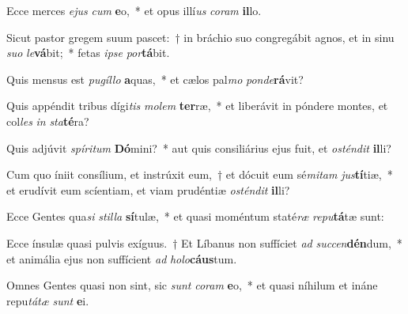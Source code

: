 \item Ecce merces \textit{e}\textit{jus} \textit{cum} \textbf{e}o,~* et opus illí\textit{us} \textit{co}\textit{ram} \textbf{il}lo.
\item Sicut pastor gregem suum pascet:~† in bráchio suo congregábit agnos, et in sinu \textit{su}\textit{o} \textit{le}\textbf{vá}bit;~* fetas \textit{ip}\textit{se} \textit{por}\textbf{tá}bit.
\item Quis mensus est \textit{pu}\textit{gíl}\textit{lo} \textbf{a}quas,~* et cælos pal\textit{mo} \textit{pon}\textit{de}\textbf{rá}vit?
\item Quis appéndit tribus dígi\textit{tis} \textit{mo}\textit{lem} \textbf{ter}ræ,~* et liberávit in póndere montes, et col\textit{les} \textit{in} \textit{sta}\textbf{té}ra?
\item Quis adjúvit \textit{spí}\textit{ri}\textit{tum} \textbf{Dó}mini?~* aut quis consiliárius ejus fuit, et \textit{os}\textit{tén}\textit{dit} \textbf{il}li?
\item Cum quo íniit consílium, et instrúxit eum,~† et dócuit eum sé\textit{mi}\textit{tam} \textit{jus}\textbf{tí}tiæ,~* et erudívit eum scíentiam, et viam prudéntiæ \textit{os}\textit{tén}\textit{dit} \textbf{il}li?
\item Ecce Gentes qua\textit{si} \textit{stil}\textit{la} \textbf{sí}tulæ,~* et quasi moméntum staté\textit{ræ} \textit{re}\textit{pu}\textbf{tá}tæ sunt:
\item Ecce ínsulæ quasi pulvis exíguus.~† Et Líbanus non suffíciet \textit{ad} \textit{suc}\textit{cen}\textbf{dén}dum,~* et animália ejus non suffícient \textit{ad} \textit{ho}\textit{lo}\textbf{cáus}tum.
\item Omnes Gentes quasi non sint, sic \textit{sunt} \textit{co}\textit{ram} \textbf{e}o,~* et quasi níhilum et ináne repu\textit{tá}\textit{tæ} \textit{sunt} \textbf{e}i.
